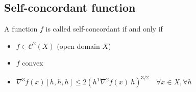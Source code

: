 %
%
%
%
%

\subsection{Self-concordant function}
\begin{definition} A function $f$ is called self-concordant if and only if
\begin{itemize}
\item $f \in \mathcal{C}^2(X)$ (open domain $X$)
\item $f$ convex
\item $\nabla^3 f(x) [h,h,h] \leq 2 (h^T \nabla^2 f(x)\ h)^{3/2} \quad \forall x \in X, \forall h$
\end{itemize}
\end{definition}

